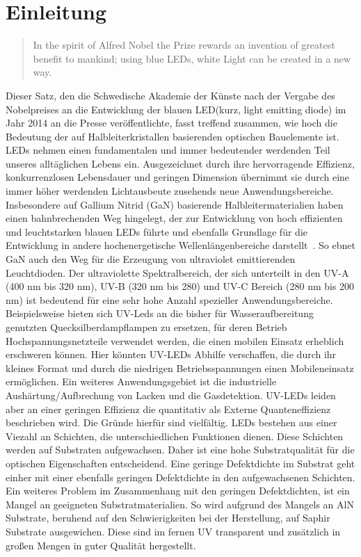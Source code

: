 
\chapter{Einleitung}
\thispagestyle{fancy}

\begin{quote}
In the spirit of Alfred Nobel the Prize rewards an invention of greatest benefit to mankind; using blue LEDs, white Light can be created in a new way.\end{quote}
Dieser Satz, den die Schwedische Akademie der Künste nach der Vergabe des Nobelpreises an die Entwicklung der blauen LED(kurz, light emitting diode) im Jahr 2014 an die Presse veröffentlichte, fasst treffend zusammen, wie hoch die Bedeutung der auf Halbleiterkristallen basierenden optischen Bauelemente ist.
LEDs nehmen einen fundamentalen und immer bedeutender werdenden Teil unseres alltäglichen Lebens ein. Ausgezeichnet durch ihre hervorragende Effizienz, konkurrenzlosen Lebensdauer und geringen Dimension übernimmt sie durch eine immer höher werdenden Lichtausbeute zusehends neue Anwendungsbereiche. 
Insbesondere auf Gallium Nitrid (GaN) basierende Halbleitermaterialien haben einen bahnbrechenden Weg hingelegt, der zur Entwicklung von hoch effizienten und leuchtstarken blauen LEDs führte und ebenfalls Grundlage für die Entwicklung in andere hochenergetische Wellenlängenbereiche darstellt~\cite{risk}.
So ebnet GaN auch den Weg für die Erzeugung von ultraviolet emittierenden Leuchtdioden. Der ultraviolette Spektralbereich, der sich unterteilt in den UV-A (400 nm bis 320 nm), UV-B (320 nm bis 280) und UV-C Bereich (280 nm bis 200 nm) ist bedeutend für eine sehr hohe Anzahl spezieller Anwendungsbereiche. Beispielsweise bieten sich UV-Leds an die bisher für Wasseraufbereitung genutzten Quecksilberdampflampen zu ersetzen, für deren Betrieb Hochspannungsnetzteile verwendet werden, die einen mobilen Einsatz erheblich erschweren können. Hier könnten UV-LEDs Abhilfe verschaffen, die durch ihr kleines Format und durch die niedrigen Betriebsspannungen einen Mobileneinsatz ermöglichen. Ein weiteres Anwendungsgebiet ist die industrielle Aushärtung/Aufbrechung von Lacken und die Gasdetektion. 
\newline
UV-LEDs leiden aber an einer geringen Effizienz die quantitativ als Externe Quanteneffizienz beschrieben wird. Die Gründe hierfür sind vielfältig. LEDs bestehen aus einer Viezahl an Schichten, die unterschiedlichen Funktionen dienen. Diese Schichten werden auf Substraten aufgewachsen. Daher ist eine hohe Substratqualität für die optischen Eigenschaften entscheidend. Eine geringe Defektdichte im Substrat geht einher mit einer ebenfalls geringen Defektdichte in den aufgewachsenen Schichten. Ein weiteres Problem im Zusammenhang mit den geringen Defektdichten, ist ein Mangel an geeigneten Substratmaterialien. So wird aufgrund des Mangels an AlN Substrate, beruhend auf den Schwierigkeiten bei der Herstellung, auf Saphir Substrate ausgewichen. Diese sind im fernen UV transparent und zusätzlich in großen Mengen in guter Qualität hergestellt.

